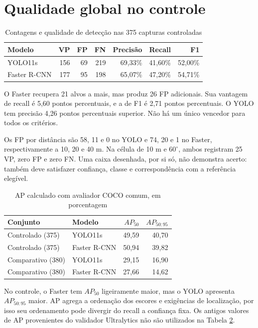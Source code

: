 \section{Qualidade global no controle}
\begin{table}[htb]
\caption{Contagens e qualidade de detecção nas 375 capturas controladas}
\label{tab:controle-global}\centering\small
\begin{tabular}{lrrrrrr}
\hline Modelo & VP & FP & FN & Precisão & Recall & F1\\\hline
YOLO11s & 156 & 69 & 219 & 69,33\% & 41,60\% & 52,00\%\\
Faster R-CNN & 177 & 95 & 198 & 65,07\% & 47,20\% & 54,71\%\\\hline
\end{tabular}
\end{table}

O Faster recupera 21 alvos a mais, mas produz 26 FP adicionais. Sua vantagem de recall é 5,60 pontos percentuais, e a de F1 é 2,71 pontos percentuais. O YOLO tem precisão 4,26 pontos percentuais superior. Não há um único vencedor para todos os critérios.

Os FP por distância são 58, 11 e 0 no YOLO e 74, 20 e 1 no Faster, respectivamente a 10, 20 e 40 m. Na célula de 10 m e $60^\circ$, ambos registram 25 VP, zero FP e zero FN. Uma caixa desenhada, por si só, não demonstra acerto: também deve satisfazer confiança, classe e correspondência com a referência elegível.

\begin{table}[htb]
\caption{AP calculado com avaliador COCO comum, em porcentagem}
\label{tab:ap-comum}\centering\small
\begin{tabular}{llrr}
\hline Conjunto & Modelo & $AP_{50}$ & $AP_{50:95}$\\\hline
Controlado (375) & YOLO11s & 49,59 & 40,70\\
Controlado (375) & Faster R-CNN & 50,94 & 39,82\\
Comparativo (380) & YOLO11s & 29,15 & 16,90\\
Comparativo (380) & Faster R-CNN & 27,66 & 14,62\\\hline
\end{tabular}
\source[Comparação Faster R-CNN, p. 15; COCOeval, maxDets=100.]
\end{table}

No controle, o Faster tem $AP_{50}$ ligeiramente maior, mas o YOLO apresenta $AP_{50:95}$ maior. AP agrega a ordenação dos escores e exigências de localização, por isso seu ordenamento pode divergir do recall a confiança fixa. Os antigos valores de AP provenientes do validador Ultralytics não são utilizados na Tabela \ref{tab:ap-comum}.

